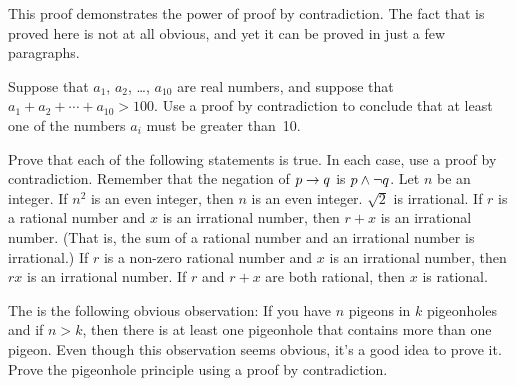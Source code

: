 This proof demonstrates the power of proof by contradiction.
The fact that is proved here is not at all obvious, and yet it can
be proved in just a few paragraphs.



\begin{exercises}

\problem Suppose that $a_1$, $a_2$, \dots, $a_{10}$ are real numbers,
and suppose that $a_1+a_2+\cdots+a_{10}>100$.  Use a proof by contradiction
to conclude that at least one of the numbers $a_i$ must be greater than~10.


\problem Prove that each of the following statements is true. 
In each case, use a proof by contradiction.  Remember that the
negation of $p\rightarrow q$ is $p \wedge \lnot q$.
\ppart Let $n$ be an integer.  If $n^2$ is an even integer, then 
$n$ is an even integer.  
\ppart $\sqrt{2}$ is irrational.
\ppart If $r$ is a rational number and $x$ is an
irrational number, then $r+x$ is an irrational number. (That is, the
sum of a rational number and an irrational number is irrational.)
\ppart If $r$ is a non-zero rational number and $x$ is an
irrational number, then $rx$ is an irrational number.    
\ppart If $r$ and $r+x$ are both rational, then $x$ is rational.

\problem The  is the following obvious
observation:  If you have $n$ pigeons in $k$ pigeonholes and if $n>k$,
then there is at least one pigeonhole that contains more than
one pigeon.  Even though this observation seems obvious, it's a
good idea to prove it.  Prove the pigeonhole principle using a
proof by contradiction.

\end{exercises}




